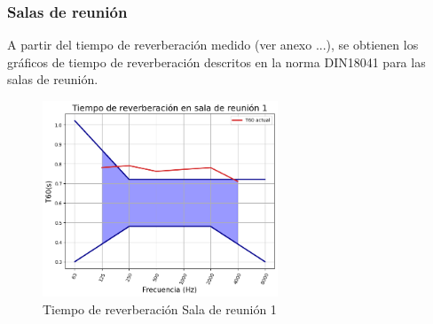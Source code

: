 \subsubsection{Salas de reunión}
A partir del tiempo de reverberación medido (ver anexo ...), se obtienen los gráficos de tiempo de reverberación descritos en la norma DIN18041 para las salas de reunión.
    \begin{figure}[H]
        \centering
        \includegraphics[width=7cm]{Imagenes/DIN/DIN sala reunion 1 actual.png}
        \caption{Tiempo de reverberación Sala de reunión 1}
        \label{fig:Ttarget sala de reunion 1}
    \end{figure}

